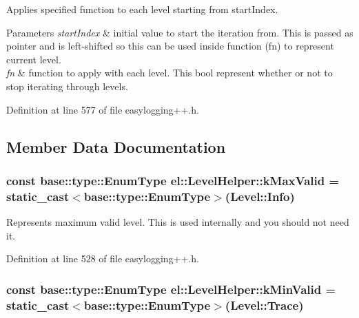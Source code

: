 Applies specified function to each level starting from start\+Index. 


\begin{DoxyParams}{Parameters}
{\em start\+Index} & initial value to start the iteration from. This is passed as pointer and is left-\/shifted so this can be used inside function (fn) to represent current level. \\
\hline
{\em fn} & function to apply with each level. This bool represent whether or not to stop iterating through levels. \\
\hline
\end{DoxyParams}


Definition at line 577 of file easylogging++.\+h.



\subsection{Member Data Documentation}
\hypertarget{classel_1_1_level_helper_aa06e80c65db5c336c4aad25872cf9a48}{}
\subsubsection[{k\+Max\+Valid}]{\setlength{\rightskip}{0pt plus 5cm}const {\bf base\+::type\+::\+Enum\+Type} el\+::\+Level\+Helper\+::k\+Max\+Valid = static\+\_\+cast$<${\bf base\+::type\+::\+Enum\+Type}$>$({\bf Level\+::\+Info})\hspace{0.3cm}{\ttfamily [static]}}\label{classel_1_1_level_helper_aa06e80c65db5c336c4aad25872cf9a48}


Represents maximum valid level. This is used internally and you should not need it. 



Definition at line 528 of file easylogging++.\+h.

\hypertarget{classel_1_1_level_helper_a3ecfe43d5b242e9946bad7f61ea4d89d}{}
\subsubsection[{k\+Min\+Valid}]{\setlength{\rightskip}{0pt plus 5cm}const {\bf base\+::type\+::\+Enum\+Type} el\+::\+Level\+Helper\+::k\+Min\+Valid = static\+\_\+cast$<${\bf base\+::type\+::\+Enum\+Type}$>$({\bf Level\+::\+Trace})\hspace{0.3cm}{\ttfamily [static]}}\label{classel_1_1_level_helper_a3ecfe43d5b242e9946bad7f61ea4d89d}


